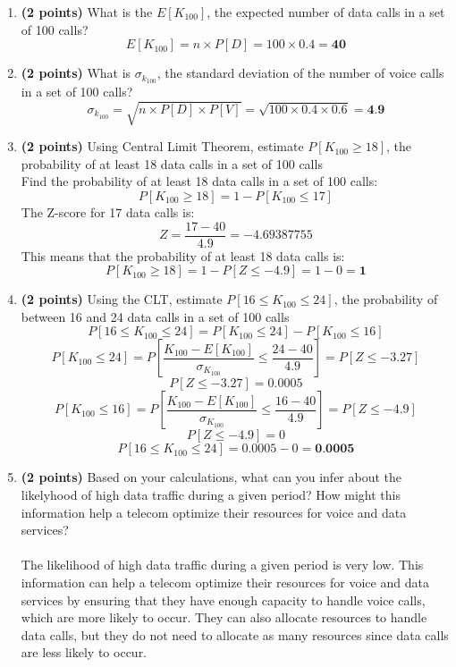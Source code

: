 \documentclass[a3paper,12pt]{extarticle} %
\begin{document}
    \begin{enumerate}
        \item \textbf{(2 points)} What is the \(E[K_{100}]\), the expected number of data calls in a set of 100 calls?
        \[
        E[K_{100}] = n \times P[D] = 100 \times 0.4 = \textbf{40}
        \]
        \item \textbf{(2 points)} What is \(\sigma_{k_{100}}\), the standard deviation of the number of voice calls in a set of 100 calls?
        \[
        \sigma_{k_{100}} = \sqrt{n \times P[D] \times P[V]} = \sqrt{100 \times 0.4 \times 0.6} = \textbf{4.9}
        \]
        \item \textbf{(2 points)} Using Central Limit  Theorem, estimate \(P[K_{100} \geq  18]\), the probability of at least 18 data calls in a set of 100 calls
        \\ Find the probability of at least 18 data calls in a set of 100 calls:
        \[
        P[K_{100} \geq 18] = 1 - P[K_{100} \leq 17]
        \]
        The Z-score for 17 data calls is:
        \[
        Z = \frac{17 - 40}{4.9} = -4.69387755
        \]
        This means that the probability of at least 18 data calls is:
        \[
        P[K_{100} \geq 18] = 1 - P[Z \leq - 4.9] = 1 - 0 = \textbf{1}
        \]
        \item \textbf{(2 points)} Using the CLT, estimate \(P[16 \leq K_{100} \leq  24]\), the probability of between 16 and 24 data calls in a set of 100 calls
        \[
        P[16 \leq K_{100} \leq 24] = P[K_{100} \leq 24] - P[K_{100} \leq 16]
        \]
        \[
        P[K_{100} \leq 24] = P\left[\frac{K_{100} - E[K_{100}]}{\sigma_{K_{100}}} \leq \frac{24 - 40}{4.9}\right] = P[Z \leq -3.27]
        \]
        \[
        P[Z \leq -3.27] = 0.0005
        \]
        \[
        P[K_{100} \leq 16] = P\left[\frac{K_{100} - E[K_{100}]}{\sigma_{K_{100}}} \leq \frac{16 - 40}{4.9}\right] = P[Z \leq -4.9]
        \]
        \[
        P[Z \leq -4.9] = 0
        \]
        \[
        P[16 \leq K_{100} \leq 24] = 0.0005 - 0 = \textbf{0.0005}
        \]
        \item \textbf{(2 points)} Based on your calculations, what can you infer about the likelyhood of high data traffic during a given period? How might this information help a telecom optimize their resources for voice and data services?
        \\\\ The likelihood of high data traffic during a given period is very low. This information can help a telecom optimize their resources for voice and data services by ensuring that they have enough capacity to handle voice calls, which are more likely to occur. They can also allocate resources to handle data calls, but they do not need to allocate as many resources since data calls are less likely to occur.
    \end{enumerate}
\end{document}

